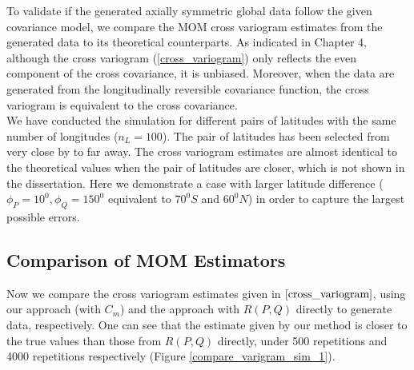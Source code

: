 
%
%

To validate if the generated axially symmetric global data follow the given covariance model, we compare the MOM cross variogram estimates from the generated data to its theoretical counterparts. As indicated in Chapter 4, although the cross variogram (\ref{cross_variogram}) only reflects the even component of the cross covariance, it is unbiased. Moreover, when the data are generated from the longitudinally reversible covariance function, the cross variogram is equivalent to the cross covariance. \\

We have conducted the simulation for different pairs of latitudes with the same number of longitudes ($n_L = 100$). The pair of latitudes has been selected from very close by to far away. The cross variogram estimates are almost identical to the theoretical values when the pair of latitudes are closer, which is not shown in the dissertation. Here we demonstrate a case with larger latitude difference ($\phi_P = 10^0, \phi_Q = 150^0$ equivalent to $70^0S$ and $60^0N$) in order to capture the largest possible errors. 


\vskip 8pt

\subsection{Comparison of MOM Estimators}

Now we compare the cross variogram estimates given in $\eqref{cross_variogram}$, using our approach (with $C_m$) and the approach with $R(P,Q)$ directly to generate data, respectively. One can see that the estimate given by our method is closer to the true values than those from $R(P, Q)$ directly, under 500 repetitions and 4000 repetitions respectively (Figure \ref{compare_varigram_sim_1}).

